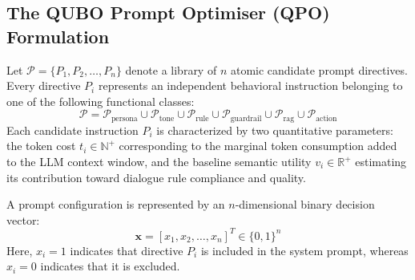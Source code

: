 \documentclass[review,12pt,times,authoryear]{elsarticle}
\theoremstyle{definition}
\begin{document}
\subsection{The QUBO Prompt Optimiser (QPO) Formulation}
Let $\mathcal{P} = \{P_1, P_2, \ldots, P_n\}$ denote a library of $n$ atomic candidate prompt directives. Every directive $P_i$ represents an independent behavioral instruction belonging to one of the following functional classes:
\begin{equation}
  \mathcal{P} = \mathcal{P}_{\mathrm{persona}} \cup \mathcal{P}_{\mathrm{tone}} \cup \mathcal{P}_{\mathrm{rule}} \cup \mathcal{P}_{\mathrm{guardrail}} \cup \mathcal{P}_{\mathrm{rag}} \cup \mathcal{P}_{\mathrm{action}}
\end{equation}
Each candidate instruction $P_i$ is characterized by two quantitative parameters: the token cost $t_i \in \mathbb{N}^+$ corresponding to the marginal token consumption added to the LLM context window, and the baseline semantic utility $v_i \in \mathbb{R}^+$ estimating its contribution toward dialogue rule compliance and quality.

A prompt configuration is represented by an $n$-dimensional binary decision vector:
\begin{equation}
  \bm{x} = [x_1, x_2, \ldots, x_n]^T \in \{0, 1\}^n
\end{equation}
Here, $x_i = 1$ indicates that directive $P_i$ is included in the system prompt, whereas $x_i = 0$ indicates that it is excluded.
\end{document}
